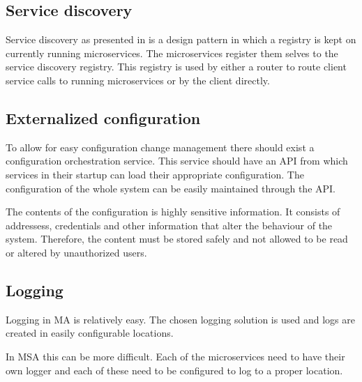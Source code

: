 \subsection{Service discovery}
\begin{sloppypar}
    Service discovery as presented in \citet{DBLP:journals/corr/MontesiW16} is a 
    design pattern in which a registry is kept on currently running microservices. 
    The microservices register them selves to the service discovery registry. 
    This registry is used by either a router to route client service calls to 
    running microservices or by the client directly.
\end{sloppypar}


\subsection{Externalized configuration}
\begin{sloppypar}
    To allow for easy configuration change management there should exist a 
    configuration orchestration service. This service should have an API from 
    which services in their startup can load their appropriate configuration. 
    The configuration of the whole system can be easily maintained through the 
    API.
\end{sloppypar}
\begin{sloppypar}
    The contents of the configuration is highly sensitive information. It 
    consists of addressess, credentials and other information that alter 
    the behaviour of the system. Therefore, the content must be stored safely 
    and not allowed to be read or altered by unauthorized users.
\end{sloppypar}

\subsection{Logging}
\begin{sloppypar}
    Logging in MA is relatively easy. The chosen logging solution is used and 
    logs are created in easily configurable locations.
\end{sloppypar}
\begin{sloppypar}
    In MSA this can be more difficult. Each of the microservices need to have 
    their own logger and each of these need to be configured to log to a 
    proper location.
\end{sloppypar}

